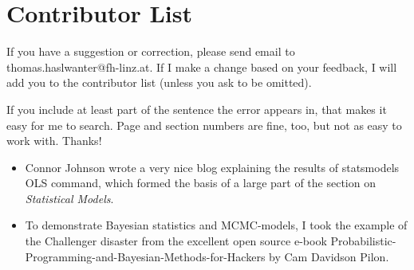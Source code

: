 \section*{Contributor List}

If you have a suggestion or correction, please send email to
thomas.haslwanter@fh-linz.at. If I make a change based on your feedback,
I will add you to the contributor list (unless you ask to be omitted).

If you include at least part of the sentence the error appears in, that
makes it easy for me to search. Page and section numbers are fine, too,
but not as easy to work with. Thanks!

\begin{itemize}
  \item Connor Johnson wrote a very nice blog explaining the results of
  statsmodels OLS command, which formed the basis of a large part of the
  section on \emph{Statistical Models}.

  \item To demonstrate Bayesian statistics and MCMC-models, I took the example of the Challenger disaster from the excellent open source e-book Probabilistic-Programming-and-Bayesian-Methods-for-Hackers by Cam Davidson Pilon.
\end{itemize}
